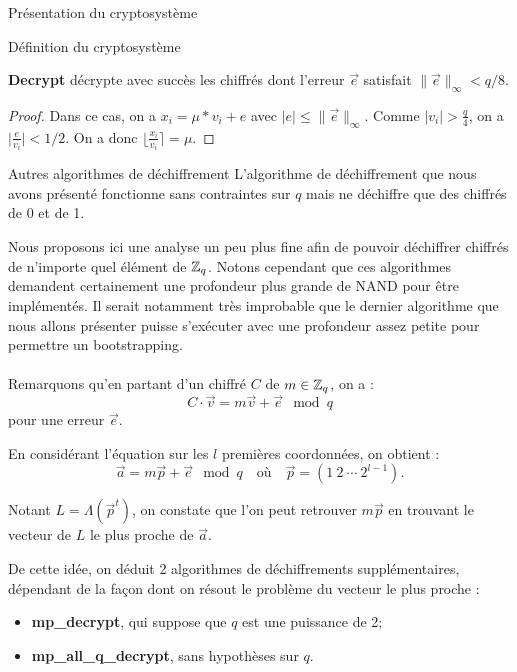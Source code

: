 \begin{section}{Présentation du cryptosystème}
\begin{subsection}{Définition du cryptosystème}
\begin{prop}
\label{dec}
\textbf{Decrypt} décrypte avec succès les chiffrés dont l'erreur $\vec{e}$ satisfait $\|\vec{e}\|_\infty < q/8$.
\end{prop}
\begin{proof}
	Dans ce cas, on a $x_i = \mu * v_i + e$ avec $\lvert e \lvert \leqslant \|\vec{e}\|_\infty$. Comme $\lvert v_i \lvert > \frac{q}{4}$, on a $\lvert \frac{e}{v_i} \lvert < 1/2$. On a donc $\lfloor \frac{x_i}{v_i} \rceil = \mu$.
\end{proof}
	\end{subsection}
	
\begin{subsection}{Autres algorithmes de déchiffrement}
	L'algorithme de déchiffrement que nous avons présenté fonctionne sans contraintes sur $q$ mais ne déchiffre que des chiffrés de 0 et de 1.

	Nous proposons ici une analyse un peu plus fine afin de pouvoir déchiffrer chiffrés de n'importe quel élément de
	$\mathbb{Z}_q$.  Notons cependant que ces algorithmes demandent certainement une profondeur plus grande de NAND pour
	être implémentés. Il serait notamment très improbable que le dernier algorithme que nous allons présenter puisse
	s'exécuter avec une profondeur assez petite pour permettre un bootstrapping.

\paragraph{}
	Remarquons qu'en partant d'un chiffré  $C$ de $m \in \mathbb{Z}_q$, on a : \[ C \cdot \vec{v} = m \vec{v} + \vec{e} \mod
	q \] pour une erreur $\vec{e}$.
	
	En considérant l'équation sur les $l$ premières coordonnées, on obtient :
	\[\vec{a} = m \vec{p} + \vec{e} \mod q\quad \text{où}\quad \vec{p} = (1\:2\:\cdots\:2^{l-1}). \]
 
	Notant $L = \Lambda(\vec{p}^t)$, on constate que l'on peut retrouver $m\vec{p}$ en trouvant le vecteur de $L$ le plus proche de $\vec{a}$.

	De cette idée, on déduit 2 algorithmes de déchiffrements supplémentaires, dépendant de la façon dont on résout le problème du vecteur le plus proche :

\begin{itemize}
\item \textbf{mp\_decrypt}, qui suppose que $q$ est une puissance de 2;
\item \textbf{mp\_all\_q\_decrypt}, sans hypothèses sur $q$.
\end{itemize}


\end{subsection}
\end{section}
